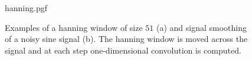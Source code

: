 \begin{figure}
    \centering
    {hanning.pgf}
    \caption[Examples of a hanning window and signal smoothing]{Examples of a hanning window of size $51$ (a) and signal smoothing of a noisy sine signal (b). The hanning window is moved across the signal and at each step one-dimensional convolution is computed. }
    \label{fig:hanning}
\end{figure}